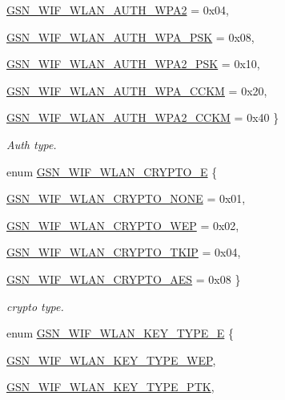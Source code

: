 \begin{DoxyCompactItemize}
\hyperlink{a00640_gga2b3917a91d576d0d037c406e6397cab9aa801aac72ada7e073ef56477001cd2fe}{GSN\_\-WIF\_\-WLAN\_\-AUTH\_\-WPA2} =  0x04, 
\par
\hyperlink{a00640_gga2b3917a91d576d0d037c406e6397cab9a2df301dcc2ba2da66f8e1bc2a70002c0}{GSN\_\-WIF\_\-WLAN\_\-AUTH\_\-WPA\_\-PSK} =  0x08, 
\par
\hyperlink{a00640_gga2b3917a91d576d0d037c406e6397cab9aadfb9e64b7645e372f4d109180b44fca}{GSN\_\-WIF\_\-WLAN\_\-AUTH\_\-WPA2\_\-PSK} =  0x10, 
\par
\hyperlink{a00640_gga2b3917a91d576d0d037c406e6397cab9aa0fa868074f7ff9aebd665edf070eb52}{GSN\_\-WIF\_\-WLAN\_\-AUTH\_\-WPA\_\-CCKM} =  0x20, 
\par
\hyperlink{a00640_gga2b3917a91d576d0d037c406e6397cab9a8bc51b5a7ed8ca4967f5ef955ab9f1a2}{GSN\_\-WIF\_\-WLAN\_\-AUTH\_\-WPA2\_\-CCKM} =  0x40
 \}
\begin{DoxyCompactList}\small\item\em Auth type. \end{DoxyCompactList}\item 
enum \hyperlink{a00677_ga49c8ff4188538f53965f3e0916f59746}{GSN\_\-WIF\_\-WLAN\_\-CRYPTO\_\-E} \{ \par
\hyperlink{a00640_gga49c8ff4188538f53965f3e0916f59746a5de19dc37abf26499707c12567818897}{GSN\_\-WIF\_\-WLAN\_\-CRYPTO\_\-NONE} =  0x01, 
\par
\hyperlink{a00640_gga49c8ff4188538f53965f3e0916f59746a74eebc9282a5ce051a677573ba6928eb}{GSN\_\-WIF\_\-WLAN\_\-CRYPTO\_\-WEP} =  0x02, 
\par
\hyperlink{a00640_gga49c8ff4188538f53965f3e0916f59746ae7316c7d6905e798ff24db647fe514b3}{GSN\_\-WIF\_\-WLAN\_\-CRYPTO\_\-TKIP} =  0x04, 
\par
\hyperlink{a00640_gga49c8ff4188538f53965f3e0916f59746afeb252a087410849b295f8b9e7c1a384}{GSN\_\-WIF\_\-WLAN\_\-CRYPTO\_\-AES} =  0x08
 \}
\begin{DoxyCompactList}\small\item\em crypto type. \end{DoxyCompactList}\item 
enum \hyperlink{a00677_ga738f68b803d29587618534b884d8b600}{GSN\_\-WIF\_\-WLAN\_\-KEY\_\-TYPE\_\-E} \{ \par
\hyperlink{a00640_gga738f68b803d29587618534b884d8b600af8dba2674fcae6ee49ea53e87e6b327c}{GSN\_\-WIF\_\-WLAN\_\-KEY\_\-TYPE\_\-WEP}, 
\par
\hyperlink{a00640_gga738f68b803d29587618534b884d8b600a384424192335ee263f6b9150bf61b80b}{GSN\_\-WIF\_\-WLAN\_\-KEY\_\-TYPE\_\-PTK}, 

\end{DoxyCompactItemize}
